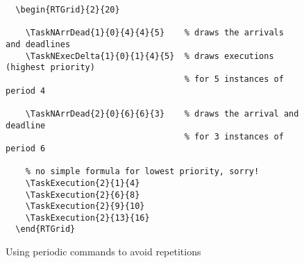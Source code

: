 \documentclass{article}
\begin{document}
\begin{figure}[!htbp]
  \centering
  \begin{RTGrid}{2}{20}
                                   

    
  \end{RTGrid}

\begin{verbatim}
  \begin{RTGrid}{2}{20}
                                   
    \TaskNArrDead{1}{0}{4}{4}{5}    % draws the arrivals and deadlines
    \TaskNExecDelta{1}{0}{1}{4}{5}  % draws executions (highest priority) 
                                    % for 5 instances of period 4 

   	\TaskNArrDead{2}{0}{6}{6}{3}    % draws the arrival and deadline
                                    % for 3 instances of period 6 
    
    % no simple formula for lowest priority, sorry!
    \TaskExecution{2}{1}{4}
    \TaskExecution{2}{6}{8}
    \TaskExecution{2}{9}{10}
    \TaskExecution{2}{13}{16}    
  \end{RTGrid}
\end{verbatim}
  \caption{Using periodic commands to avoid repetitions}
  \label{fig:ex1a}
\end{figure}
\end{document}
